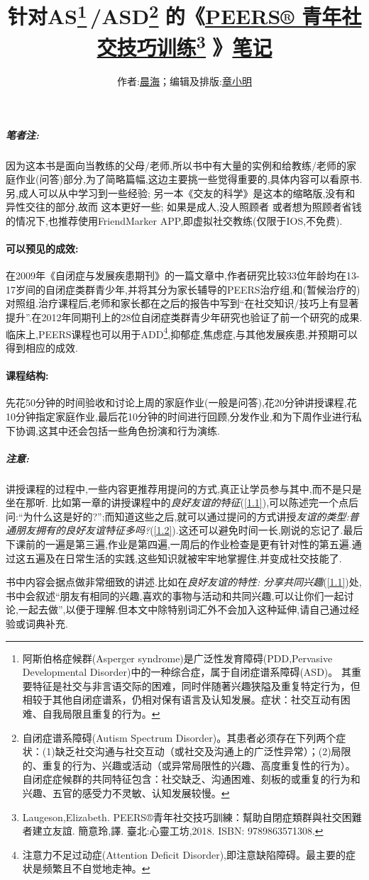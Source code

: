 \documentclass[UTF8]{article}
\title{针对AS\footnote{阿斯伯格症候群(Asperger syndrome)是广泛性发育障碍(PDD,Pervasive Developmental Disorder)中的一种综合症，属于自闭症谱系障碍(ASD)。 其重要特征是社交与非言语交际的困难，同时伴随著兴趣狭隘及重复特定行为，但相较于其他自闭症谱系，仍相对保有语言及认知发展。症状：社交互动有困难、自我局限且重复的行为。}\,/ASD\footnote{自闭症谱系障碍(Autism Spectrum Disorder)。其患者必须存在下列两个症状：(1)缺乏社交沟通与社交互动（或社交及沟通上的广泛性异常）；(2)局限的、重复的行为、兴趣或活动（或异常局限性的兴趣、高度重复性的行为）。 自闭症症候群的共同特征包含：社交缺乏、沟通困难、刻板的或重复的行为和兴趣、五官的感受力不灵敏、认知发展较慢。}\,\,的《\href{https://book.douban.com/subject/30403423/}{PEERS® 青年社交技巧训练}\footnote{Laugeson,Elizabeth. PEERS®青年社交技巧訓練：幫助自閉症類群與社交困難者建立友誼. 簡意玲,譯. 臺北:心靈工坊,2018. ISBN: 9789863571308.}\,\,》\href{https://www.douban.com/group/topic/153935186/}{笔记}}
\author{作者:\href{https://www.douban.com/people/terest/}{晨海}；编辑及排版:\href{https://www.douban.com/people/zhangxm2312/}{章小明}}
\date{}
\newcommand{\warn}{\subparagraph*{注意:}}
\begin{document}
\maketitle

\subparagraph*{笔者注:} 因为这本书是面向当教练的父母/老师,所以书中有大量的实例和给教练/老师的家庭作业(问答)部分,为了简略篇幅,这边主要挑一些觉得重要的,具体内容可以看原书. 另,成人可以从中学习到一些经验; 另一本《交友的科学》是这本的缩略版,没有和异性交往的部分,故而 这本更好一些; 如果是成人,没人照顾者 或者想为照顾者省钱的情况下,也推荐使用FriendMarker APP,即虚拟社交教练(仅限于IOS,不免费).

\paragraph*{可以预见的成效:} 在2009年《自闭症与发展疾患期刊》的一篇文章中,作者研究比较33位年龄均在13-17岁间的自闭症类群青少年,并将其分为家长辅导的PEERS治疗组,和(暂候治疗的)对照组.治疗课程后,老师和家长都在之后的报告中写到``在社交知识/技巧上有显著提升''.在2012年同期刊上的28位自闭症类群青少年研究也验证了前一个研究的成果. 临床上,PEERS课程也可以用于ADD\footnote{注意力不足过动症(Attention Deficit Disorder),即注意缺陷障碍。最主要的症状是频繁且不自觉地走神。},抑郁症,焦虑症,与其他发展疾患,并预期可以得到相应的成效.

\paragraph*{课程结构:} 先花50分钟的时间验收和讨论上周的家庭作业(一般是问答),花20分钟讲授课程,花10分钟指定家庭作业,最后花10分钟的时间进行回顾,分发作业,和为下周作业进行私下协调,这其中还会包括一些角色扮演和行为演练.

\warn 讲授课程的过程中,一些内容更推荐用提问的方式,真正让学员参与其中,而不是只是坐在那听. 比如第一章的讲授课程中的\emph{良好友谊的特征}(\ref{1.1}),可以陈述完一个点后问:``为什么这是好的?'';而知道这些之后,就可以通过提问的方式讲授\emph{友谊的类型:普通朋友拥有的良好友谊特征多吗?}(\ref{1.2}).这还可以避免时间一长,刚说的忘记了.最后下课前的一遍是第三遍,作业是第四遍,一周后的作业检查是更有针对性的第五遍.通过这五遍及在日常生活的实践,这些知识就被牢牢地掌握住,并变成社交技能了.

\vspace{3pt}
书中内容会据点做非常细致的讲述.比如在\emph{良好友谊的特性: 分享共同兴趣}(\ref{1.1})处,书中会叙述``朋友有相同的兴趣,喜欢的事物与活动和共同兴趣,可以让你们一起讨论,一起去做'',以便于理解.但本文中除特别词汇外不会加入这种延伸,请自己通过经验或词典补充.
\end{document}
